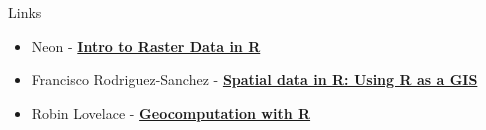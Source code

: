 \documentclass[ignorenonframetext,]{beamer}
\begin{document}
\begin{frame}{Links}
\protect\hypertarget{links}{}

\begin{itemize}
\item
  Neon -
  \href{https://www.neonscience.org/dc-raster-data-r}{\textbf{Intro to
  Raster Data in R}}
\item
  Francisco Rodriguez-Sanchez -
  \href{https://pakillo.github.io/R-GIS-tutorial/\#raster}{\textbf{Spatial
  data in R: Using R as a GIS}}
\item
  Robin Lovelace -
  \href{https://geocompr.robinlovelace.net/}{\textbf{Geocomputation with
  R}}
\end{itemize}

\end{frame}
\end{document}
